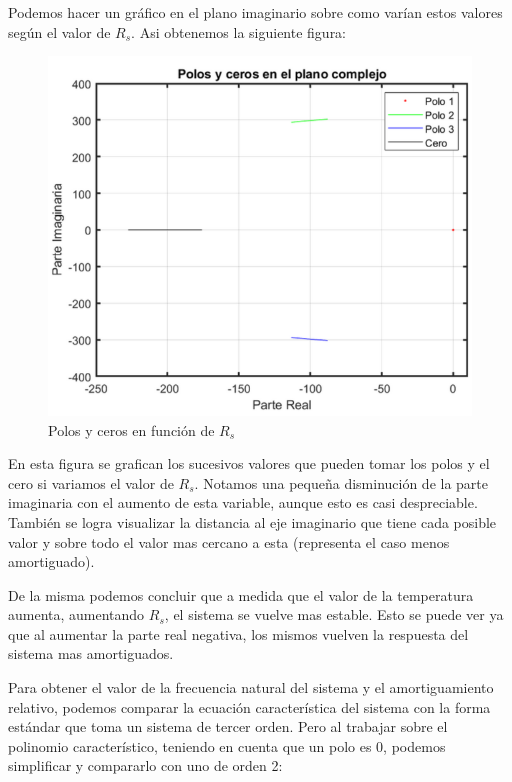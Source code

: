 \documentclass{article}
\begin{document}
Podemos hacer un gráfico en el plano imaginario sobre como varían estos valores según el valor de 
$R_s$. Asi obtenemos la siguiente figura:

\begin{figure}[H]
    \centering
    \includegraphics{polosyceros.png}
    \caption{Polos y ceros en función de $R_s$}
\end{figure}

En esta figura se grafican los sucesivos valores que pueden tomar los polos y el cero si variamos el 
valor de $R_s$. Notamos una pequeña disminución de la parte imaginaria con el aumento de esta variable, 
aunque esto es casi despreciable. También se logra visualizar la distancia al eje imaginario que 
tiene cada posible valor y sobre todo el valor mas cercano a esta (representa el caso menos 
amortiguado).

De la misma podemos concluir que a medida que el valor de la temperatura aumenta, aumentando $R_s$, el 
sistema se vuelve mas estable. Esto se puede ver ya que al aumentar la parte real negativa, los 
mismos vuelven la respuesta del sistema mas amortiguados.

Para obtener el valor de la frecuencia natural del sistema y el amortiguamiento relativo, podemos 
comparar la ecuación característica del sistema con la forma estándar que toma un sistema de tercer 
orden. Pero al trabajar sobre el polinomio característico, teniendo en cuenta que un polo es 0, 
podemos simplificar y compararlo con uno de orden 2:
\end{document}
